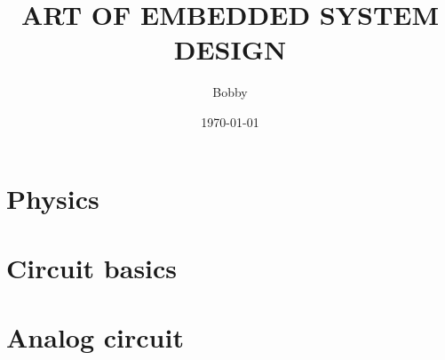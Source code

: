 \documentclass[UTF8]{book}
\title{ART OF EMBEDDED SYSTEM DESIGN }
\author{Bobby}
\date{\today}
\begin{document}
	\maketitle
	\frontmatter
	

	\tableofcontents
	
	\mainmatter
	\part{Physics}
	\label{Physics}
	

	\begin{comment} 
	\chapter{Solid state physics}
	\label{Solid state physics}
	\chapter{Semiconductor physics}
	\label{Semiconductor physics}
	\end{comment}

	
	
	\part{Circuit basics}
	\label{Circuit basics}
	
	\part{Analog circuit}
	\label{Analog circuit}
	
	\begin{comment} 
	rather stupid, but helpful 
	\chapter{Transistor circuit analysis}
	\label{Transistor circuit analysis}
	\chapter{Transistor circuit design}
	\label{Transistor circuit design}
	\chapter{FET circuit analysis}
	\label{FET circuit analysis}
	\chapter{FET circuit design}
	\label{FET circuit design}
	\end{comment}
	
\end{document}
